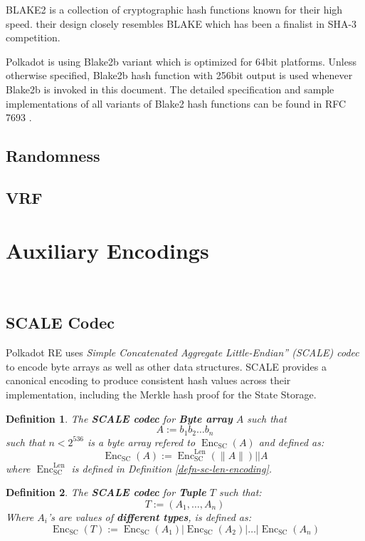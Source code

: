 \documentclass{article}
\newcommand{\assign}{:=}
\newcommand{\tmem}[1]{{\em #1\/}}
\newcommand{\tmop}[1]{\ensuremath{\operatorname{#1}}}
\newcommand{\tmstrong}[1]{\textbf{#1}}
\newcommand{\tmtextbf}[1]{{\bfseries{#1}}}
\newcommand{\tmtextit}[1]{{\itshape{#1}}}
\newtheorem{definition}{Definition}
\providecommand{\tmem}[1]{\tmtextit{#1}}
\providecommand{\tmop}[1]{\ensuremath{\mathrm{#1}}}
\providecommand{\tmstrong}[1]{\tmtextbf{#1}}
\providecommand{\tmtextbf}[1]{\tmtextbf{#1}}
\providecommand{\tmtextit}[1]{\tmtextit{#1}}
\newtheorem{definition}{Definition}
\begin{document}
BLAKE2 is a collection of cryptographic hash functions known for their high
speed. their design closely resembles BLAKE which has been a finalist in SHA-3
competition.

Polkadot is using Blake2b variant which is optimized for 64bit platforms.
Unless otherwise specified, Blake2b hash function with 256bit output is used
whenever Blake2b is invoked in this document. The detailed specification and
sample implementations of all variants of Blake2 hash functions can be found
in RFC 7693 {\cite{saarinen_blake2_2015}}.

\subsection{Randomness}\label{sect-randomness}

\subsection{VRF}\label{sect-vrf}

\section{Auxiliary Encodings}\label{sect-encoding}

\

\subsection{SCALE Codec}\label{sect-scale-codec}

Polkadot RE uses {\tmem{Simple Concatenated Aggregate Little-Endian'' (SCALE)
codec}} to encode byte arrays as well as other data structures. SCALE provides
a canonical encoding to produce consistent hash values across their
implementation, including the Merkle hash proof for the State Storage.

\begin{definition}
  \label{defn-scale-byte-array}The {\tmstrong{SCALE codec}} for
  {\tmstrong{Byte array}} $A$ such that
  \[ A \assign b_1 b_2 \ldots b_n \]
  such that $n < 2^{536}$ is a byte array refered to $\tmop{Enc}_{\tmop{SC}}
  (A)$ and defined as:
  \[ \tmop{Enc}_{\tmop{SC}} (A) \assign \tmop{Enc}^{\tmop{Len}}_{\tmop{SC}}
     (\| A \|) | | A \]
  where $\tmop{Enc}_{\tmop{SC}}^{\tmop{Len}}$ is defined in Definition
  \ref{defn-sc-len-encoding}. 
\end{definition}

\begin{definition}
  \label{defn-scale-tuple}The {\tmstrong{SCALE codec}} for {\tmstrong{Tuple}}
  $T$ such that:
  \[ T \assign (A_1, \ldots, A_n) \]
  Where $A_i$'s are values of {\tmstrong{different types}}, is defined as:
  \[ \tmop{Enc}_{\tmop{SC}} (T) \assign \tmop{Enc}_{\tmop{SC}} (A_1) |
     \tmop{Enc}_{\tmop{SC}} (A_2) | \ldots | \tmop{Enc}_{\tmop{SC}} (A_n) \]
\end{definition}
\end{document}
